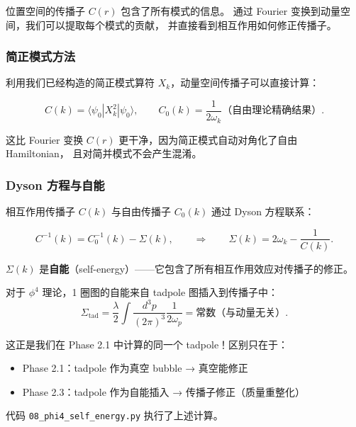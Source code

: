 \documentclass[12pt,a4paper]{article}
\begin{document}
\label{sec:self-energy}

位置空间的传播子 $C(r)$ 包含了所有模式的信息。
通过 Fourier 变换到动量空间，我们可以提取每个模式的贡献，
并直接看到相互作用如何修正传播子。

\subsubsection*{简正模式方法}

利用我们已经构造的简正模式算符 $X_k$，动量空间传播子可以直接计算：

\begin{equation}
C(k) = \langle \psi_0 | X_k^2 | \psi_0 \rangle,
\qquad
C_0(k) = \frac{1}{2\omega_k} \text{（自由理论精确结果）}.
\label{eq:Ck-direct}
\end{equation}

这比 Fourier 变换 $C(r)$ 更干净，因为简正模式自动对角化了自由 Hamiltonian，
且对简并模式不会产生混淆。

\subsubsection*{Dyson 方程与自能}

相互作用传播子 $C(k)$ 与自由传播子 $C_0(k)$ 通过 Dyson 方程联系：

\begin{equation}
C^{-1}(k) = C_0^{-1}(k) - \Sigma(k),
\qquad\Longrightarrow\qquad
\Sigma(k) = 2\omega_k - \frac{1}{C(k)}.
\label{eq:dyson}
\end{equation}

$\Sigma(k)$ 是\textbf{自能}（self-energy）——它包含了所有相互作用效应对传播子的修正。

对于 $\phi^4$ 理论，1 圈图的自能来自 tadpole 图插入到传播子中：
\begin{equation}
\Sigma_{\text{tad}} = \frac{\lambda}{2} \int \frac{d^3p}{(2\pi)^3} \frac{1}{2\omega_p}
= \text{常数（与动量无关）}.
\label{eq:tad-self-energy}
\end{equation}

这正是我们在 Phase 2.1 中计算的同一个 tadpole！区别只在于：
\begin{itemize}[nosep]
\item Phase 2.1：tadpole 作为真空 bubble → 真空能修正
\item Phase 2.3：tadpole 作为自能插入 → 传播子修正（质量重整化）
\end{itemize}

代码 \texttt{08\_phi4\_self\_energy.py} 执行了上述计算。
\end{document}
